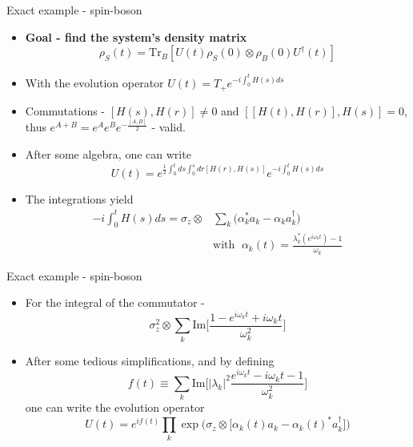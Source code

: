 \documentclass[10pt,xcolor={table,dvipsnames},t]{beamer}
\begin{document}
\begin{frame}{Exact example - spin-boson}
  \begin{itemize}
    \item<1-> \textbf{Goal - find the system's density matrix}
      \begin{equation}
        \rho_S(t) = \text{Tr}_B [U(t)\rho_S(0)\otimes \rho_B(0)U^\dag(t)]
      \end{equation}
    \item<2-> With the evolution operator $U(t)=T_+e^{-i\int_0^t H(s)ds}$
    \item<3-> Commutations - $[H(s), H(r)]\neq 0$ and $[[H(t),H(r)],H(s)] = 0$, thus 
      $e^{A+B}=e^{A}e^{B}e^{-\frac{[A,B]}{2}}$ - valid.
    \item<3-> After some algebra, one can write 
      \begin{equation}
        U(t) = e^{\frac{1}{2} \int_0^t ds \int_0^s dr[H(r),H(s)]}e^{-i\int_0^tH(s)ds}
      \end{equation}
    \item<4-> The integrations yield 
      \begin{equation}
        \begin{split}
          -i\int_0^tH(s)ds = \sigma_z\otimes &\sum_k\bigl( \alpha_k^*a_k - \alpha_k a_k^\dag \bigr)\\
                                             &\text{with }\; \alpha_k(t)=\frac{\lambda_k^*(e^{i\omega_kt})-1}{\omega_k}
        \end{split}
      \end{equation}
  \end{itemize}
\end{frame}

\begin{frame}{Exact example - spin-boson}
  \begin{itemize}
    \item<1-> For the integral of the commutator - 
      \begin{equation}
        \sigma_z^2\otimes \sum_k \text{Im}\biggl[\frac{1-e^{i\omega_k t}+i\omega_k t}{\omega_k^2} \biggr]
      \end{equation}
    \item<2-> After some tedious simplifications, and by defining 
      \begin{equation}
        f(t) \equiv \sum_k \text{Im}\biggl[ |\lambda_k|^2 \frac{e^{i\omega_kt}-i\omega_k t -1}{\omega_k^2} 
        \biggr]
      \end{equation}
      one can write the evolution operator 
      \begin{equation}
        U(t)=e^{if(t)}\prod_k \exp\biggl(\sigma_z\otimes \bigl[ \alpha_k(t)a_k - 
        \alpha_k(t)^*a_k^\dag \bigr] \biggr)
      \end{equation}
  \end{itemize}
\end{frame}

\smallframetitle
\end{document}
